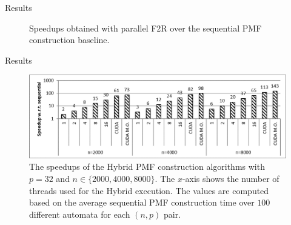 \documentclass{beamer}
\begin{document}
\begin{frame}{Results}
\begin{figure}[ht]
{	}
	\caption{Speedups obtained with parallel F2R over the sequential PMF construction baseline.}
\end{figure}
\end{frame}

\begin{frame}{Results}
\begin{figure}[ht]
	\centering
	\includegraphics[height=0.4\textheight]{figs/hybrid_speedup_p32.png}
	
	\caption{The speedups of the Hybrid PMF construction algorithms with $p = 32$ and $n \in \{2000, 4000, 8000\}$. The $x$-axis shows the number of threads used for the Hybrid execution.  The values are computed based on the average sequential PMF construction time over $100$ different automata for each $(n, p)$ pair.}
	\label{fig:hybrid-speedup}
\end{figure}
\end{frame}
\end{document}
